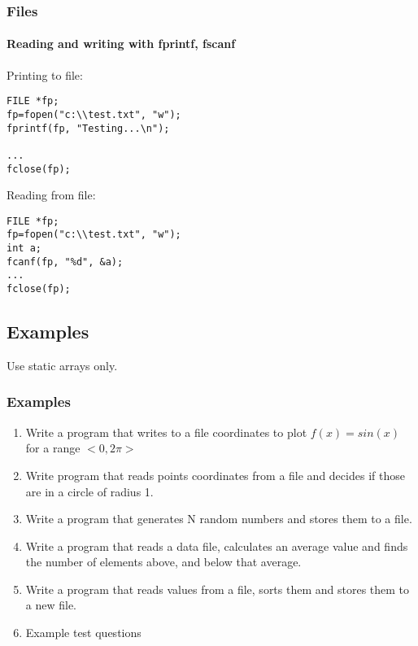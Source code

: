 \documentclass[10pt]{beamer}
\begin{document}
\begin{frame}[fragile]
  \frametitle{Files}
  \framesubtitle{Reading and writing with fprintf, fscanf}
Printing to file:
\begin{lstlisting}
FILE *fp;
fp=fopen("c:\\test.txt", "w");
fprintf(fp, "Testing...\n");

...
fclose(fp);
\end{lstlisting}

Reading from file:
\begin{lstlisting}
FILE *fp;
fp=fopen("c:\\test.txt", "w");
int a;
fcanf(fp, "%d", &a);
...
fclose(fp);
\end{lstlisting}
 
\end{frame}

\subsection{Examples}

\begin{frame}
  Use static arrays only.
  \frametitle{Examples}
  \begin{enumerate}
  \item Write a program that writes to a file coordinates to plot $f(x)=sin(x)$
for a range $<0,2\pi>$
  \item Write program that reads points coordinates from a file and decides if those are in a circle of radius 1.
  \item Write a program that generates N random numbers and stores them to a file.
  \item Write a program that reads a data file, calculates an average value and finds the number of elements above, and below that average.
  \item Write a program that reads values from a file, sorts them and stores them to a new file.
  \item Example test questions
\end{enumerate}
  
\end{frame}
\end{document}
